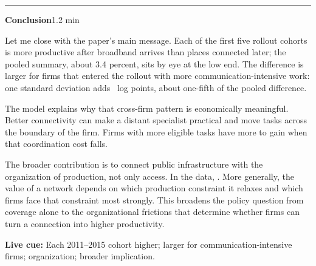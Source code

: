 \documentclass[11pt]{article}
\newcommand{\Cue}[1]{\par\nobreak\smallskip\noindent\textcolor{ScriptGray}{\footnotesize
  \textbf{Live cue:} #1}\par}
\newcommand{\scriptframe}[3]{%
  \Needspace{11\baselineskip}%
  \par\medskip\noindent\textcolor{ScriptBlue}{\rule{\linewidth}{0.55pt}}%
  \par\smallskip\noindent
  \textbf{#1}\hfill\textcolor{ScriptGray}{\small #2}\par\smallskip
  #3\par}
\begin{document}
\begin{samepage}
\scriptframe{Conclusion}{1.2 min}{%
  Let me close with the paper's main message. Each of the first five rollout
  cohorts is more productive after broadband arrives than places connected
  later; the pooled summary, about 3.4 percent, sits by eye at the low end. The difference
  is larger for firms that entered the rollout with more communication-intensive
  work: one standard deviation adds \ResCommSDGap\ log points, about one-fifth
  of the pooled difference.

  The model explains why that cross-firm pattern is economically meaningful.
  Better connectivity can make a distant specialist practical and move tasks
  across the boundary of the firm. Firms with more eligible tasks have more to
  gain when that coordination cost falls.

  The broader contribution is to connect public infrastructure with the
  organization of production, not only access. In the data, \ResultImplicationSpoken. More generally, the value of a network
  depends on which production constraint it relaxes and which firms face that
  constraint most strongly. This broadens the policy question from coverage alone to
  the organizational frictions that determine whether firms can turn a
  connection into higher productivity.
  \Cue{Each 2011--2015 cohort higher; larger for communication-intensive firms; organization; broader implication.}
}
\end{samepage}

\end{document}
